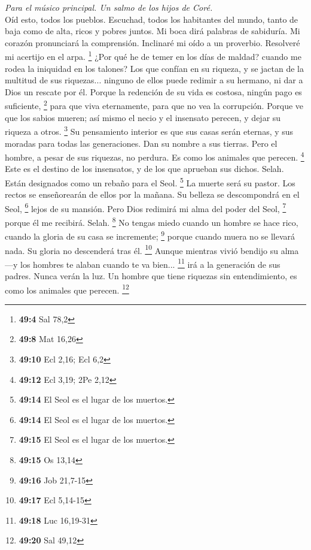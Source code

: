 \begin{paracol}{2}
\emph{Para el músico principal. Un salmo de los hijos de Coré.}\\
 Oíd esto, todos los pueblos. Escuchad, todos los
habitantes del mundo,  tanto de baja como de alta, ricos y
pobres juntos.  Mi boca dirá palabras de sabiduría. Mi
corazón pronunciará la comprensión.  Inclinaré mi oído a
un proverbio. Resolveré mi acertijo en el arpa. \footnote{\textbf{49:4}
  Sal 78,2}  ¿Por qué he de temer en los días de maldad?
cuando me rodea la iniquidad en los talones?  Los que
confían en su riqueza, y se jactan de la multitud de sus riquezas...
 ninguno de ellos puede redimir a su hermano, ni dar a
Dios un rescate por él.  Porque la redención de su vida es
costosa, ningún pago es suficiente, \footnote{\textbf{49:8} Mat 16,26}
 para que viva eternamente, para que no vea la corrupción.
 Porque ve que los sabios mueren; así mismo el necio y el
insensato perecen, y dejar su riqueza a otros. \footnote{\textbf{49:10}
  Ecl 2,16; Ecl 6,2}  Su pensamiento interior es que sus
casas serán eternas, y sus moradas para todas las generaciones. Dan su
nombre a sus tierras.  Pero el hombre, a pesar de sus
riquezas, no perdura. Es como los animales que perecen. \footnote{\textbf{49:12}
  Ecl 3,19; 2Pe 2,12}  Este es el destino de los
insensatos, y de los que aprueban sus dichos. Selah. 
Están designados como un rebaño para el Seol. \footnote{\textbf{49:14}
  El Seol es el lugar de los muertos.} La muerte será su pastor. Los
rectos se enseñorearán de ellos por la mañana. Su belleza se
descompondrá en el Seol, \footnote{\textbf{49:14} El Seol es el lugar de
  los muertos.} lejos de su mansión.  Pero Dios redimirá
mi alma del poder del Seol, \footnote{\textbf{49:15} El Seol es el lugar
  de los muertos.} porque él me recibirá. Selah. \footnote{\textbf{49:15}
  Os 13,14}  No tengas miedo cuando un hombre se hace
rico, cuando la gloria de su casa se incremente; \footnote{\textbf{49:16}
  Job 21,7-15}  porque cuando muera no se llevará nada.
Su gloria no descenderá tras él. \footnote{\textbf{49:17} Ecl 5,14-15}
 Aunque mientras vivió bendijo su alma ---y los hombres
te alaban cuando te va bien... \footnote{\textbf{49:18} Luc 16,19-31}
 irá a la generación de sus padres. Nunca verán la luz.
 Un hombre que tiene riquezas sin entendimiento, es como
los animales que perecen. \footnote{\textbf{49:20} Sal 49,12}


\end{paracol}
